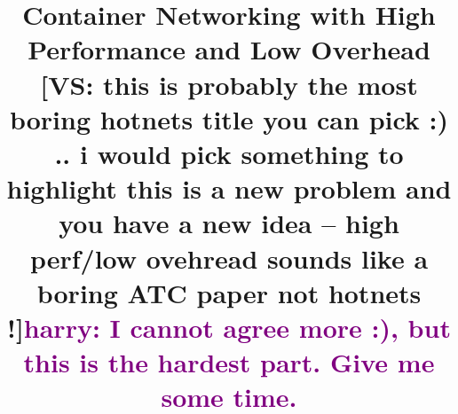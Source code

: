 \documentclass{cls/hotnets16}
\def\harry#1{{\textcolor{purple}{harry: {\sf #1}}}}
\newcommand{\vyas}[1]{{\footnotesize\color{red}[VS: #1]}}
\begin{document}
\title{Container Networking with High Performance and Low Overhead \vyas{this is probably the most boring hotnets title you can pick :) .. i would pick 
 something to highlight this is a new problem and you have a new idea -- high perf/low ovehread sounds like a boring ATC paper not hotnets !}\harry{I cannot agree more :), but this is the hardest part. Give me some time.}}

\date{}


\maketitle
\thispagestyle{empty}









%
%
\end{document}
